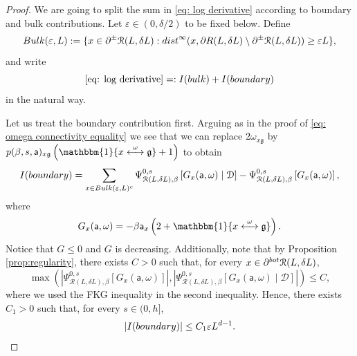 \documentclass[11pt,a4paper]{article}
\renewcommand{\epsilon}{\varepsilon}
\theoremstyle{definition}
\numberwithin{equation}{section}
\newcommand\fg{\mathfrak{g}}
\begin{document}
\begin{proof}
We are going to split the sum in \eqref{eq: log derivative} according to boundary and bulk contributions. Let $\epsilon \in (0,\delta/2)$ to be fixed below. Define
\begin{equation}
{\rm Bulk}(\varepsilon, L):= \{ x \in \partial^{\pm}\mathcal{R}(L,\delta L): {\rm dist}^\infty( x, \partial R(L,\delta L) \setminus \partial^\pm \mathcal R(L,\delta L)) \geq \varepsilon L \},
\end{equation}
and write
\begin{equation}
\eqref{eq: log derivative} =: I({\rm bulk}) + I({\rm boundary})
\end{equation}
in the natural way. 

Let us treat the boundary contribution first. Arguing as in the proof of \eqref{eq: omega connectivity equality} we see that we can replace $2\omega_{x\fg}$ by $p(\beta,s,\mathsf{a})_{x\fg} \left(\mathbbm{1}\{x\overset{\omega}{\longleftrightarrow}\fg\}+1\right)$ to obtain
\begin{equation}\label{eq: derivative formula bulk}
I({\rm boundary}) = \sum_{x \in {\rm Bulk}(\varepsilon,L)^c}
\Psi^{0,s}_{\mathcal R(L,\delta L),\beta}\left[G_x(\mathsf{a},\omega) \mid  \mathcal{D}\right] -\Psi^{0,s}_{\mathcal R(L,\delta L),\beta}\left[G_x(\mathsf{a},\omega)\right],
\end{equation}
where
\begin{equation}
G_x(\mathsf{a},\omega)=-\beta \mathsf{a}_x\left(2+\mathbbm{1}\{x\overset{\omega}{\longleftrightarrow}\fg\}\right).    
\end{equation}
Notice that $G \leq 0$ and $G$ is decreasing. Additionally, note that by Proposition \ref{prop:regularity}, there exists $C>0$ such that, for every $x\in \partial^{\rm bot}\mathcal{R}(L,\delta L)$,
\begin{equation}
    \max \left( \left|\Psi^{0,s}_{\mathcal R(L,\delta L),\beta}\left[G_x(\mathsf{a},\omega)\right]\right|,  
    \left|\Psi^{0,s}_{\mathcal R(L,\delta L),\beta}\left[G_x(\mathsf{a},\omega) \mid  \mathcal{D}\right]\right| \right) \leq C,\label{eq: general control summand}
\end{equation}
where we used the FKG inequality in the second inequality. Hence, there exists $C_1 > 0$ such that, for every $s \in (0,h]$,
\begin{equation}
|I({\rm boundary})| \leq C_1 \varepsilon L^{d-1}.
\end{equation}


\end{proof}
\end{document}
